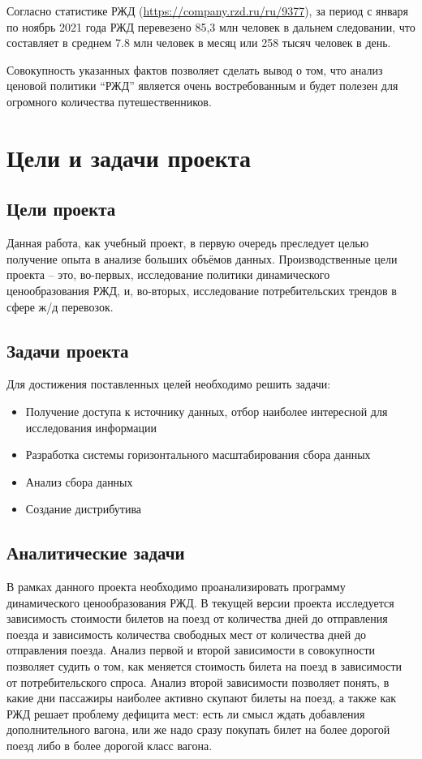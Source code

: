 \documentclass[conference]{IEEEtran}
\begin{document}
Согласно статистике РЖД (\href{https://company.rzd.ru/ru/9377}{https://company.rzd.ru/ru/9377}), за период с января по ноябрь 2021 года РЖД перевезено 85,3 млн человек в дальнем следовании, что составляет в среднем 7.8 млн человек в месяц или 258 тысяч человек в день.

Совокупность указанных фактов позволяет сделать вывод о том, что анализ ценовой политики ``РЖД'' является очень востребованным и будет полезен для огромного количества путешественников.

\section{Цели и задачи проекта}

\subsection{Цели проекта}
Данная работа, как учебный проект, в первую очередь преследует целью получение опыта в анализе больших объёмов данных. Производственные цели проекта -- это, во-первых, исследование политики динамического ценообразования РЖД, и, во-вторых, исследование потребительских трендов в сфере ж/д перевозок.

\subsection{Задачи проекта}

Для достижения поставленных целей необходимо решить задачи:
\begin{itemize}
	\item Получение доступа к источнику данных, отбор наиболее интересной для исследования информации
	\item Разработка системы горизонтального масштабирования сбора данных
	\item Анализ сбора данных
	\item Создание дистрибутива
\end{itemize} 

\subsection{Аналитические задачи}

В рамках данного проекта необходимо проанализировать программу динамического ценообразования РЖД. В текущей версии проекта исследуется зависимость стоимости билетов на поезд от количества дней до отправления поезда и зависимость количества свободных мест от количества дней до отправления поезда. Анализ первой и второй зависимости в совокупности позволяет судить о том, как меняется стоимость билета на поезд в зависимости от потребительского спроса. Анализ второй зависимости позволяет понять, в какие дни пассажиры наиболее активно скупают билеты на поезд, а также как РЖД решает проблему дефицита мест: есть ли смысл ждать добавления дополнительного вагона, или же надо сразу покупать билет на более дорогой поезд либо в более дорогой класс вагона.
\end{document}
